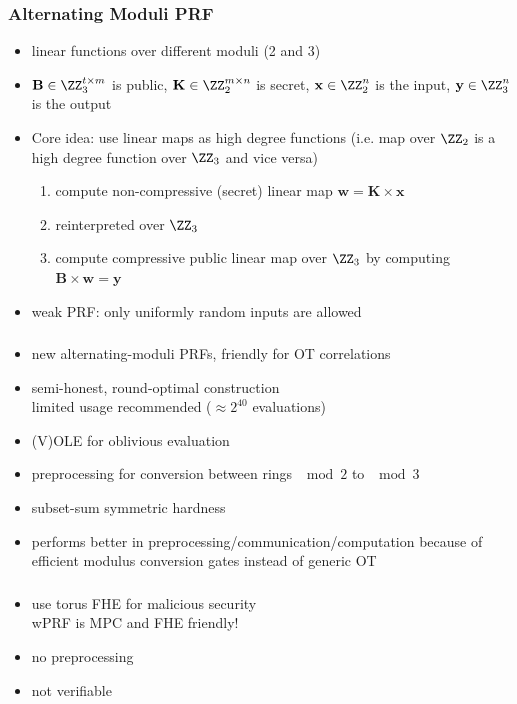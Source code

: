 \documentclass[aspectratio=169, 12pt,handout]{beamer}
\newcommand{\bv}[1]{\mathbf{#1}}
\begin{document}
\begin{frame}
  \frametitle{Alternating Moduli PRF}
  \begin{itemize}
    \item linear functions over different moduli (2 and 3)   \pause
    \item $\bv{B}\in\ZZ_3^{t\times m}$ is public, $\bv{K}\in\ZZ_2^{m\times n}$
      is secret, 
    $\bv{x}\in \ZZ_2^n$ is the input, $\bv{y}\in \ZZ_3^n$ is the output\pause
  \item Core idea: use linear maps as high degree functions (i.e. 
        map over $\ZZ_2$ is  a high degree function over $\ZZ_3$ and vice
        versa)\pause
  \begin{enumerate}
    \item compute non-compressive (secret) linear map $\bv{w}=\bv{K}\times
      \bv{x}$\pause
      \item reinterpreted over
      $\ZZ_3$\pause
      \item compute compressive public linear map over $\ZZ_3$ by computing
      $\bv{B}\times\bv{w}=\bv{y}$\pause
  \end{enumerate}
    \item weak PRF: only uniformly random inputs are allowed
  \end{itemize}
\end{frame}

\begin{frame}
  \frametitle{\cite{C:DGHIKS21}}
  \begin{itemize}
    \item new alternating-moduli PRFs, friendly for OT correlations\pause
    \item semi-honest, round-optimal construction\pause \\
     limited usage recommended ($\approx 2^{40}$ evaluations)\pause
    \item (V)OLE for oblivious evaluation\pause
    \item preprocessing for conversion between rings $\mod 2$ to $\mod 3$
    \item subset-sum symmetric hardness\pause
    \item performs better in preprocessing/communication/computation because
      of efficient modulus conversion gates instead of generic OT
  \end{itemize}
\end{frame}

\begin{frame}
  \frametitle{\cite{EC:ADDG24}}
  \begin{itemize}
    \item use torus FHE for malicious security \\ \pause wPRF is MPC and FHE
      friendly!
    \item no preprocessing\pause
    \item not verifiable~\cite{AC:CheoJan25}
  \end{itemize}

\end{frame}
\end{document}
